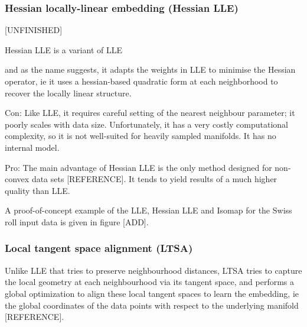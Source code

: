 \documentclass[journal, a4paper]{IEEEtran}
\begin{document}
\hfill
\subsubsection{Hessian locally-linear embedding (Hessian LLE)}
[UNFINISHED]

Hessian LLE is a variant of LLE

and as the name suggests, it adapts the weights in LLE to minimise the Hessian operator, ie it uses a hessian-based quadratic form at each neighborhood to recover the locally linear structure. 

Con: Like LLE, it requires careful setting of the nearest neighbour parameter; it poorly scales with data size.
Unfortunately, it has a very costly computational complexity, so it is not well-suited for heavily sampled manifolds. It has no internal model.

Pro: The main advantage of Hessian LLE is the only method designed for non-convex data sets [REFERENCE].
It tends to yield results of a much higher quality than LLE. 


A proof-of-concept example of the LLE, Hessian LLE and Isomap for the Swiss roll input data is given in figure [ADD].

\hfill
\subsubsection{Local tangent space alignment (LTSA)}

Unlike LLE that tries to preserve neighbourhood distances, LTSA tries to capture the local geometry at each neighbourhood via its tangent space, and performs a global optimization to align these local tangent spaces to learn the embedding, ie the global coordinates of the data points with respect to the underlying manifold [REFERENCE].
\end{document}
